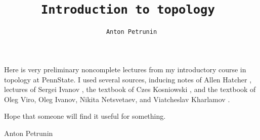 \documentclass[twoside]{book}
\begin{document}

\title{
\tt Introduction to topology
}
\author{\tt Anton Petrunin}
\date{}
\maketitle
\thispagestyle{empty}

Here is very preliminary noncomplete lectures from my introductory course in topology at PennState.
I used several sources, inducing  
notes of Allen Hatcher \cite{hatcher},
lectures of Sergei Ivanov \cite{ivanov},
the textbook of Czes Kosniowski \cite{kosniowski},
and the textbook of Oleg Viro, Oleg Ivanov, Nikita Netsvetaev, and Viatcheslav Kharlamov \cite{VINKh}.



Hope that someone will find it useful for something.

\medskip


\begin{flushright}
Anton Petrunin
\end{flushright}
\null\vfill{}
\newpage
\tableofcontents












%
%
%
%
%

\appendix
%

{\footnotesize

}



{\small\sloppy


\def\emph{\textit}

\printbibliography[heading=bibintoc]
\fussy
}
\end{document}
